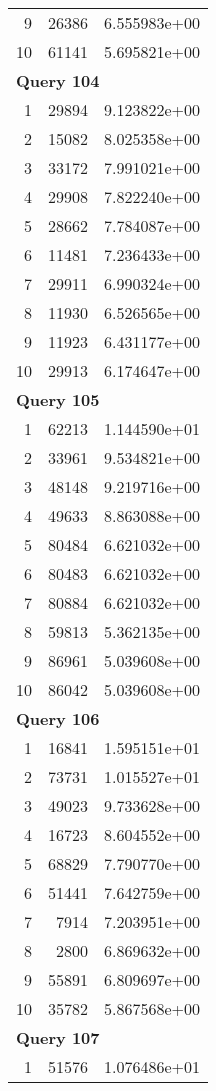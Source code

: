 \begin{longtable}[{p}]{@{}rrp{}@{}}
9 & 26386 & 6.555983e+00 \\
10 & 61141 & 5.695821e+00 \\
\midrule
\multicolumn{3}{l}{\bfseries Query 104} \\
1 & 29894 & 9.123822e+00 \\
2 & 15082 & 8.025358e+00 \\
3 & 33172 & 7.991021e+00 \\
4 & 29908 & 7.822240e+00 \\
5 & 28662 & 7.784087e+00 \\
6 & 11481 & 7.236433e+00 \\
7 & 29911 & 6.990324e+00 \\
8 & 11930 & 6.526565e+00 \\
9 & 11923 & 6.431177e+00 \\
10 & 29913 & 6.174647e+00 \\
\midrule
\multicolumn{3}{l}{\bfseries Query 105} \\
1 & 62213 & 1.144590e+01 \\
2 & 33961 & 9.534821e+00 \\
3 & 48148 & 9.219716e+00 \\
4 & 49633 & 8.863088e+00 \\
5 & 80484 & 6.621032e+00 \\
6 & 80483 & 6.621032e+00 \\
7 & 80884 & 6.621032e+00 \\
8 & 59813 & 5.362135e+00 \\
9 & 86961 & 5.039608e+00 \\
10 & 86042 & 5.039608e+00 \\
\midrule
\multicolumn{3}{l}{\bfseries Query 106} \\
1 & 16841 & 1.595151e+01 \\
2 & 73731 & 1.015527e+01 \\
3 & 49023 & 9.733628e+00 \\
4 & 16723 & 8.604552e+00 \\
5 & 68829 & 7.790770e+00 \\
6 & 51441 & 7.642759e+00 \\
7 & 7914 & 7.203951e+00 \\
8 & 2800 & 6.869632e+00 \\
9 & 55891 & 6.809697e+00 \\
10 & 35782 & 5.867568e+00 \\
\midrule
\multicolumn{3}{l}{\bfseries Query 107} \\
1 & 51576 & 1.076486e+01 \\

\end{longtable}
